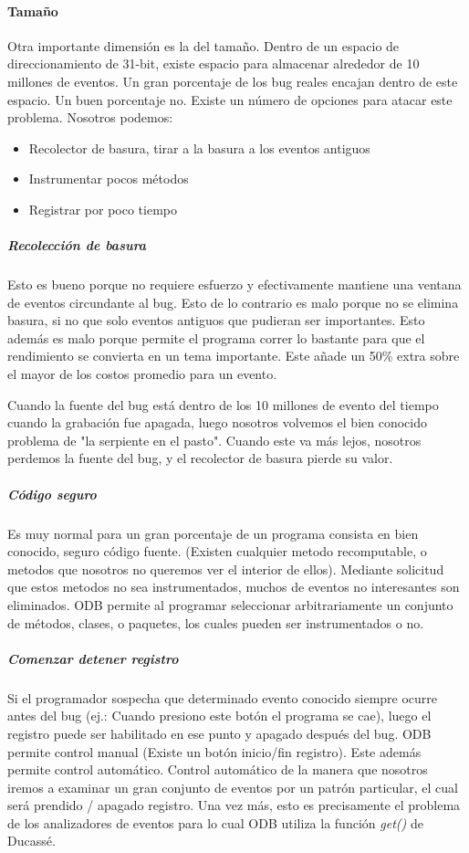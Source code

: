 \documentclass[12pt,a4paper]{report}
\begin{document}
				\paragraph{Tamaño}

Otra importante dimensión es la del tamaño.  Dentro de un espacio de direccionamiento de 31-bit, existe espacio para almacenar alrededor de 10 millones de eventos.  Un gran porcentaje de los bug reales encajan dentro de este espacio.  Un buen porcentaje no.  Existe un número de opciones para atacar este problema.  Nosotros podemos:
\begin{itemize}
	\item Recolector de basura, tirar a la basura a los eventos antiguos
	\item Instrumentar pocos métodos
	\item Registrar por poco tiempo 
\end{itemize}

					\subparagraph{Recolección de basura}

Esto es bueno porque no requiere esfuerzo y efectivamente mantiene una ventana de eventos circundante al bug.  Esto de lo contrario es malo porque no se elimina basura, si no que solo eventos antiguos que pudieran ser importantes.  Esto además es malo porque permite el programa correr lo bastante para que el rendimiento se convierta en un tema importante.  Este añade un 50\% extra sobre el mayor de los costos promedio para un evento.

Cuando la fuente del bug está dentro de los 10 millones de evento del tiempo cuando la grabación fue apagada, luego nosotros volvemos el bien conocido problema de "la serpiente en el pasto". Cuando este va más lejos, nosotros perdemos la fuente del bug, y el recolector de basura pierde su valor.

					\subparagraph{Código seguro}

Es muy normal para un gran porcentaje de un programa consista en bien conocido, seguro código fuente. (Existen cualquier metodo recomputable, o metodos que nosotros no queremos ver el interior de ellos).  Mediante solicitud que estos metodos no sea instrumentados, muchos de eventos no interesantes son eliminados.  ODB permite al programar seleccionar arbitrariamente un conjunto de métodos, clases, o paquetes, los cuales pueden ser instrumentados o no.

					\subparagraph{Comenzar detener registro}

Si el programador sospecha que determinado evento conocido siempre ocurre antes del bug (ej.: Cuando presiono este botón el programa se cae), luego el registro puede ser habilitado en ese punto y apagado después del bug.  ODB permite control manual (Existe un botón inicio/fin registro).  Este además permite control automático.  Control automático de la manera que nosotros iremos a examinar un gran conjunto de eventos por un patrón particular, el cual será prendido / apagado registro.  Una vez más, esto es precisamente el problema de los analizadores de eventos para lo cual ODB utiliza la función \textit{get()} de Ducassé.
\end{document}

